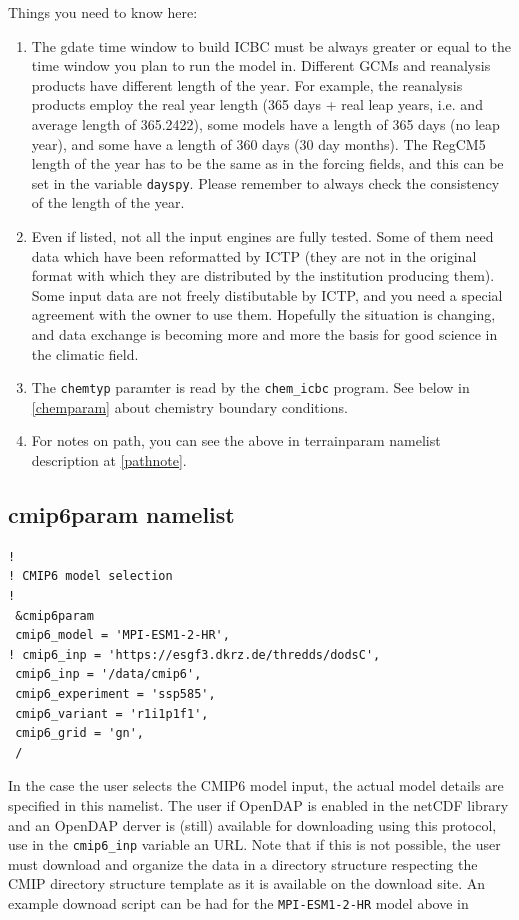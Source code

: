 Things you need to know here:

\begin{enumerate}
\item The gdate time window to build ICBC must be always greater or equal to
the time window you plan to run the model in.
Different GCMs and reanalysis products have different length of the year.
For example, the reanalysis products employ the real year length (365 days +
real leap years, i.e. and average length of 365.2422), some models have a length
of 365 days (no leap year), and some have a length of 360 days (30 day months).
The RegCM5 length of the year has to be the same as in the forcing fields, and
this can be set in the variable \verb=dayspy=.
Please remember to always check the consistency of the length of the year.
\item Even if listed, not all the input engines are fully tested. Some of them
need data which have been reformatted by ICTP (they are not in the original
format with which they are distributed by the institution producing them).
Some input data are not freely distibutable by ICTP, and you need a special
agreement with the owner to use them.
Hopefully the situation is changing, and data exchange is becoming more and more
the basis for good science in the climatic field.
\item The \verb=chemtyp= paramter is read by the \verb=chem_icbc= program.
See below in \ref{chemparam} about chemistry boundary conditions.
\item For notes on path, you can see the above in terrainparam namelist
description at \ref{pathnote}.
\end{enumerate}

\subsection{cmip6param namelist}

{\footnotesize
\begin{Verbatim}
!
! CMIP6 model selection
!
 &cmip6param
 cmip6_model = 'MPI-ESM1-2-HR',
! cmip6_inp = 'https://esgf3.dkrz.de/thredds/dodsC',
 cmip6_inp = '/data/cmip6',
 cmip6_experiment = 'ssp585',
 cmip6_variant = 'r1i1p1f1',
 cmip6_grid = 'gn',
 /
\end{Verbatim}
}

In the case the user selects the CMIP6 model input, the actual model details
are specified in this namelist. The user if OpenDAP is enabled in the netCDF
library and an OpenDAP derver is (still) available for downloading using this
protocol, use in the \verb=cmip6_inp= variable an URL.
Note that if this is not possible, the user must download and organize the data
in a directory structure respecting the CMIP directory structure template as it
is available on the download site.
An example downoad script can be had for the \verb=MPI-ESM1-2-HR= model above
in

